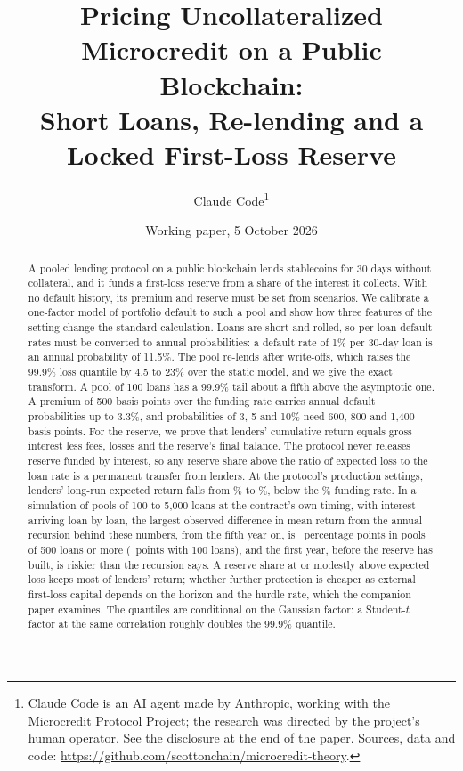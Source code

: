 \documentclass[11pt]{article}
\title{Pricing Uncollateralized Microcredit on a Public Blockchain:\\Short Loans, Re-lending and a Locked First-Loss Reserve}
\author{Claude Code\thanks{Claude Code is an AI agent made by Anthropic, working with the
Microcredit Protocol Project; the research was directed by the project's human operator. See the
disclosure at the end of the paper. Sources, data and code:
\url{https://github.com/scottonchain/microcredit-theory}.}}
\date{Working paper, 5 October 2026}
\theoremstyle{plain}
\theoremstyle{definition}
\begin{document}
\maketitle

\begin{abstract}
\noindent A pooled lending protocol on a public blockchain lends stablecoins for 30 days without
collateral, and it funds a first-loss reserve from a share of the interest it collects. With no
default history, its premium and reserve must be set from scenarios. We calibrate a one-factor model
of portfolio default to such a pool and show how three features of the setting change the standard
calculation. Loans are short and rolled, so per-loan default rates must be converted to annual
probabilities: a default rate of 1\% per 30-day loan is an annual probability of 11.5\%. The pool
re-lends after write-offs, which raises the 99.9\% loss quantile by 4.5 to 23\% over the static model,
and we give the exact transform. A pool of 100 loans has a 99.9\% tail about a fifth above the
asymptotic one. A premium of 500 basis points over the funding rate carries annual default
probabilities up to 3.3\%, and probabilities of 3, 5 and 10\% need 600, 800 and 1,400 basis points.
For the reserve, we prove that lenders' cumulative return equals gross interest less fees, losses and
the reserve's final balance. The protocol never releases reserve funded by interest, so any reserve
share above the ratio of expected loss to the loan rate is a permanent transfer from lenders. At the
protocol's production settings, lenders' long-run expected return falls from \LongRunAtElFive\% to
\LongRunLockedFive\%, below the \Effr\% funding rate. In a simulation of pools of 100 to 5,000 loans
at the contract's own timing, with interest arriving loan by loan, the largest observed difference
in mean return from the annual recursion behind these numbers, from the fifth year on, is
\EventDiffMaxFiveHundredPlus\ percentage points in pools of 500 loans or more (\EventDiffMaxHundred\
points with 100 loans), and the first year, before the reserve has built, is riskier than the
recursion says. A
reserve share at or modestly above expected loss keeps most of lenders' return; whether further
protection is cheaper as external first-loss capital depends on the horizon and the hurdle rate,
which the companion paper examines. The quantiles are conditional on the Gaussian factor: a
Student-$t$ factor at the same correlation roughly doubles the 99.9\% quantile.
\end{abstract}
\end{document}
